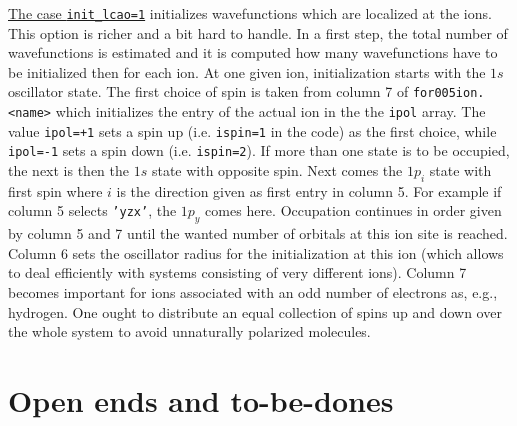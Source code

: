 \documentclass[12pt]{article}
\begin{document}
\underline{The case {\tt init\_lcao=1}} initializes wavefunctions
which are localized at the ions. This option is richer and a bit hard
to handle. In a first step, the total number of wavefunctions is
estimated and it is computed how many wavefunctions have to be
initialized then for each ion. At one given ion, initialization starts
with the $1s$ oscillator state. The first choice of spin is taken from
column 7 of {\tt for005ion.<name>} {which initializes the entry of the
  actual ion in the the {\tt ipol}
array. The value {\tt ipol=+1} sets a spin up (i.e. {\tt ispin=1} in
the code) as the first choice, 
while {\tt ipol=-1} sets a spin down (i.e. {\tt ispin=2}).} If more than one state is to be
occupied, the next is then the $1s$ state with opposite spin. Next
comes the $1p_i$ state with first spin where $i$ is the direction
given as first entry in column 5. For example if column 5 selects
{\tt 'yzx'}, the $1p_y$ comes here. Occupation continues in order
given by column 5 and 7 until the wanted number of orbitals at this
ion site is reached. Column 6 sets the oscillator radius for the
initialization at this ion (which allows to deal efficiently with
systems consisting of very different ions). Column 7 becomes important
for ions associated with an odd number of electrons as, e.g.,
hydrogen. One ought to distribute an equal collection of 
{spins up and down over the whole system} to avoid unnaturally 
polarized molecules.

\newpage

\section{Open ends and to-be-dones}
\end{document}
